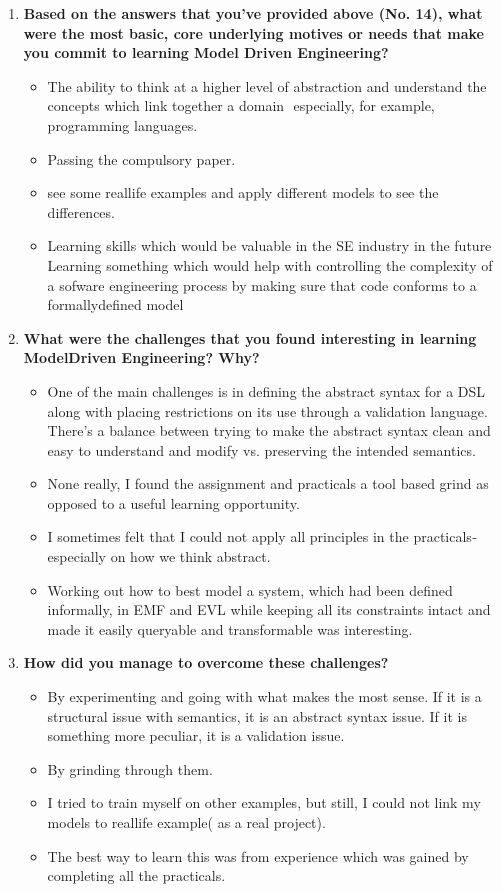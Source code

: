 \documentclass[12pt, a4paper]{report}
\begin{document}
{\begin{appendices}
\begin{enumerate}
\item \textbf{ Based on the answers that you’ve provided above (No. 1­4), what were the most basic, core underlying motives or needs that make you commit to learning Model­
Driven Engineering?}

\begin{itemize}
\item The ability to think at a higher level of abstraction and understand the concepts which link together a domain ­ especially, for example, programming languages. 
\item Passing the compulsory paper.
\item see some real­life examples and apply different models to see the differences. 
\item Learning skills which would be valuable in the SE industry in the future Learning something which would help with controlling the complexity of a sofware engineering process by making sure that code
conforms to a formally­defined model
\end{itemize}


\item \textbf{ What were the challenges that you found interesting in learning Model­Driven Engineering? Why?}
\begin{itemize}
\item One of the main challenges is in defining the abstract syntax for a DSL along with placing restrictions on its use through a validation language. There's a balance between trying to make the abstract syntax clean and easy to understand and modify vs. preserving the intended semantics.
\item None really, I found the assignment and practicals a tool based grind as opposed to a useful learning opportunity.
\item I sometimes felt that I could not apply all principles in the practicals­ especially on how we think abstract.
\item Working out how to best model a system, which had been defined informally, in EMF and EVL while keeping all its constraints intact and made it easily queryable and transformable was interesting.
\end{itemize}



\item \textbf{How did you manage to overcome these challenges?}
\begin{itemize}
\item By experimenting and going with what makes the most sense. If it is a structural issue with semantics, it is an abstract syntax issue. If it is something more peculiar, it is a validation issue.
\item By grinding through them.
\item I tried to train myself on other examples, but still, I could not link my models to real­life example( as a real project). 
\item The best way to learn this was from experience which was gained by completing all the practicals.
\end{itemize}



\end{enumerate}
\end{appendices}}
\end{document}

